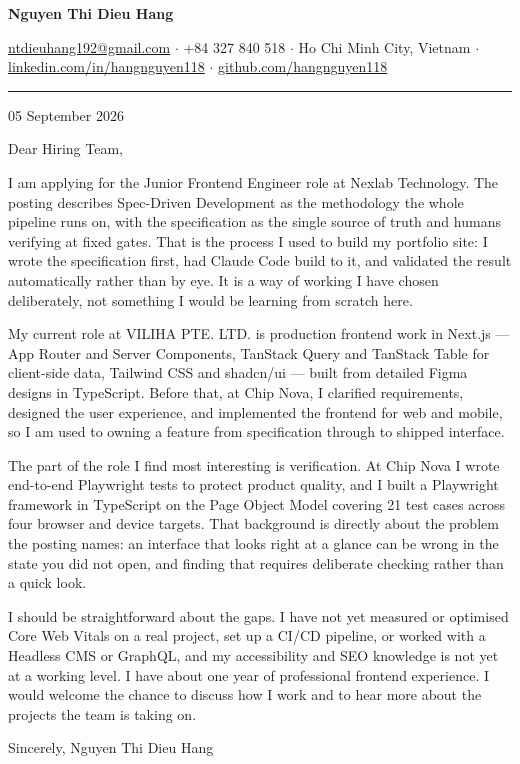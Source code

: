 \documentclass[11pt,a4paper]{article}
\newcommand{\clname}[1]{{\fontsize{17}{19}\selectfont\bfseries #1}\par\vspace{0.2em}}
\newcommand{\clcontact}[1]{{\small\color{muted}#1}\par\vspace{0.3em}%
  {\color{rulegray}\rule{\linewidth}{0.5pt}}\par}
\newcommand{\cldate}[1]{{\small\color{muted}#1}\par}
\begin{document}
\clname{Nguyen Thi Dieu Hang}
\clcontact{\href{mailto:ntdieuhang192@gmail.com}{ntdieuhang192@gmail.com} $\cdot$ +84 327 840 518 $\cdot$ Ho Chi Minh City, Vietnam $\cdot$ \href{https://www.linkedin.com/in/hangnguyen118}{linkedin.com/in/hangnguyen118} $\cdot$ \href{https://github.com/hangnguyen118}{github.com/hangnguyen118}}
\cldate{05 September 2026}

Dear Hiring Team,

I am applying for the Junior Frontend Engineer role at Nexlab Technology. The posting describes Spec-Driven Development as the methodology the whole pipeline runs on, with the specification as the single source of truth and humans verifying at fixed gates. That is the process I used to build my portfolio site: I wrote the specification first, had Claude Code build to it, and validated the result automatically rather than by eye. It is a way of working I have chosen deliberately, not something I would be learning from scratch here.

My current role at VILIHA PTE. LTD. is production frontend work in Next.js — App Router and Server Components, TanStack Query and TanStack Table for client-side data, Tailwind CSS and shadcn/ui — built from detailed Figma designs in TypeScript. Before that, at Chip Nova, I clarified requirements, designed the user experience, and implemented the frontend for web and mobile, so I am used to owning a feature from specification through to shipped interface.

The part of the role I find most interesting is verification. At Chip Nova I wrote end-to-end Playwright tests to protect product quality, and I built a Playwright framework in TypeScript on the Page Object Model covering 21 test cases across four browser and device targets. That background is directly about the problem the posting names: an interface that looks right at a glance can be wrong in the state you did not open, and finding that requires deliberate checking rather than a quick look.

I should be straightforward about the gaps. I have not yet measured or optimised Core Web Vitals on a real project, set up a CI/CD pipeline, or worked with a Headless CMS or GraphQL, and my accessibility and SEO knowledge is not yet at a working level. I have about one year of professional frontend experience. I would welcome the chance to discuss how I work and to hear more about the projects the team is taking on.

Sincerely, Nguyen Thi Dieu Hang
\end{document}
